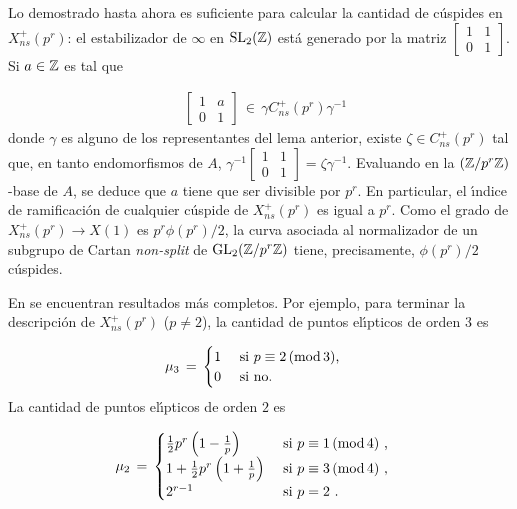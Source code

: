 Lo demostrado hasta ahora es suficiente para calcular la cantidad de c\'{u}spides
en $X_{ns}^{+}(p^{r})$: el estabilizador de $\infty$ en $\SL{2}(\bb{Z})$ est\'{a}
generado por la matriz
\begin{math}\left[
 \begin{smallmatrix}
  1&1\\0&1
 \end{smallmatrix}
\right]
\end{math}.
Si $a\in\bb{Z}$ es tal que

\begin{align*}
 &
 \begin{bmatrix}
  1&a\\0&1
 \end{bmatrix}
 \,\in\,\gamma C_{ns}^{+}(p^{r})\gamma^{-1}
\end{align*}
donde $\gamma$ es alguno de los representantes del lema anterior, existe
$\zeta\in C_{ns}^{+}(p^{r})$ tal que, en tanto endomorfismos de $A$,
\begin{math}\gamma^{-1}\left[
 \begin{smallmatrix}
  1&1\\0&1
 \end{smallmatrix}
\right]=\zeta\gamma^{-1}
\end{math}. Evaluando en la $(\bb{Z}/p^{r}\bb{Z})$-base de $A$, se deduce que
$a$ tiene que ser divisible por $p^{r}$. En particular, el \'{\i}ndice de
ramificaci\'{o}n de cualquier c\'{u}spide de $X_{ns}^{+}(p^{r})$ es igual a
$p^{r}$. Como el grado de $X_{ns}^{+}(p^{r})\rightarrow X(1)$ es
$p^{r}\phi(p^{r})/2$, la curva asociada al normalizador de un subgrupo de Cartan
\textit{non-split} de $\GL{2}(\bb{Z}/p^{r}\bb{Z})$ tiene, precisamente,
$\phi(p^{r})/2$ c\'{u}spides.

En \cite{baranNormalizers} se encuentran resultados m\'{a}s completos. Por ejemplo,
para terminar la descripci\'{o}n de $X_{ns}^{+}(p^{r})$ ($p\not =2$),
la cantidad de puntos el\'{\i}pticos de orden $3$ es

\begin{align*}
 \mu_{3} & \,=\,\begin{cases}
                 1  & \text{ si } p\equiv 2\,(\rm{mod}\,3)\text{,}\\
                 0  & \text{ si no.}
                \end{cases}
\end{align*}
La cantidad de puntos el\'{\i}pticos de orden $2$ es

\begin{align*}
 \mu_{2} & \,=\,\begin{cases}
                 \frac{1}{2}p^{r}\left(1-\frac{1}{p}\right) &  \text{ si }
                 p\equiv 1\,(\rm{mod}\,4)\text{ ,}\\
                 1+\frac{1}{2}p^{r}\left(1+\frac{1}{p}\right) & \text{ si }
                 p\equiv 3\,(\rm{mod}\,4)\text{ ,}\\
                 2^{r-1} & \text{ si } p=2\text{ .}
                \end{cases}
\end{align*}

